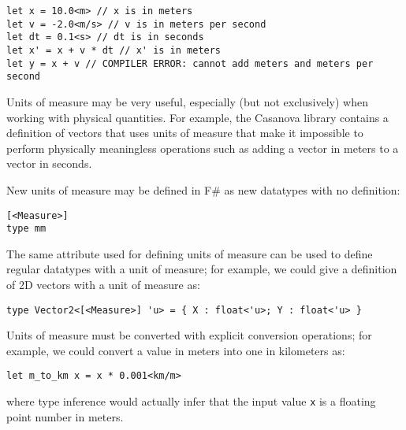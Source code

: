 \begin{lstlisting}
let x = 10.0<m> // x is in meters
let v = -2.0<m/s> // v is in meters per second
let dt = 0.1<s> // dt is in seconds
let x' = x + v * dt // x' is in meters
let y = x + v // COMPILER ERROR: cannot add meters and meters per second
\end{lstlisting}

Units of measure may be very useful, especially (but not exclusively) when working with physical quantities. For example, the Casanova library contains a definition of vectors that uses units of measure that make it impossible to perform physically meaningless operations such as adding a vector in meters to a vector in seconds.

New units of measure may be defined in F\# as new datatypes with no definition:

\begin{lstlisting}
[<Measure>]
type mm
\end{lstlisting}

The same attribute used for defining units of measure can be used to define regular datatypes with a unit of measure; for example, we could give a definition of 2D vectors with a unit of measure as:

\begin{lstlisting}
type Vector2<[<Measure>] 'u> = { X : float<'u>; Y : float<'u> }
\end{lstlisting}

Units of measure must be converted with explicit conversion operations; for example, we could convert a value in meters into one in kilometers as:

\begin{lstlisting}
let m_to_km x = x * 0.001<km/m>
\end{lstlisting}

where type inference would actually infer that the input value \texttt{x} is a floating point number in meters.
